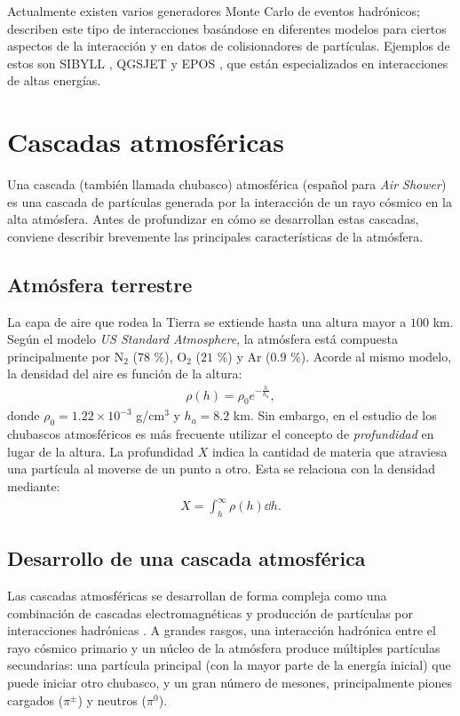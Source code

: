 	Actualmente existen varios generadores Monte Carlo de eventos hadrónicos; describen este tipo de interacciones basándose en diferentes modelos para ciertos aspectos de la interacción y en datos de colisionadores de partículas. Ejemplos de estos son SIBYLL \cite{Sibyll}, QGSJET \cite{qgsjet} y EPOS \cite{EPOS}, que están especializados en interacciones de altas energías. 
	

\section{Cascadas atmosf\'ericas}
	Una cascada (tambi\'en llamada chubasco) atmosf\'erica (español para \textit{Air Shower}) es una cascada de partículas generada por la interacción de un rayo cósmico en la alta atmósfera. Antes de profundizar en cómo se desarrollan estas cascadas, conviene describir brevemente las principales características de la atmósfera.
	
	\subsection{Atmósfera terrestre}
	La capa de aire que rodea la Tierra se extiende hasta una altura  mayor a $100$ km. Según el modelo \textit{US Standard Atmosphere}, la atmósfera está compuesta principalmente por N$_2$ ($78$ \%), O$_2$ ($21$ \%) y Ar ($0.9$ \%). Acorde al mismo modelo, la densidad del aire es función de la altura:
	\begin{align}
	\rho(h)=\rho_0 e^{-\frac{h}{h_a}},
	\end{align}
	donde $\rho_0 = 1.22\times 10^{-3}$ g/cm$^3$ y $h_a = 8.2$ km. Sin embargo, en el estudio de los chubascos atmosféricos es más frecuente utilizar el concepto de \textit{profundidad} en lugar de la altura. La profundidad $X$ indica la cantidad de materia que atraviesa una partícula al moverse de un punto a otro. Esta se relaciona con la densidad mediante:
	\begin{align}
	X = \int_h^{\infty} \rho (h) \dd h.
	\end{align}

	\subsection{Desarrollo de una cascada atmosférica}	
	Las cascadas atmosf\'ericas se desarrollan de forma compleja como una combinación de cascadas electromagnéticas y producción de partículas por interacciones hadrónicas \cite{Matthews2005}. A grandes rasgos, una interacción hadrónica entre el rayo cósmico primario y un núcleo de la atmósfera produce múltiples partículas secundarias: una partícula principal (con la mayor parte de la energía inicial) que puede iniciar otro chubasco, y un gran número de mesones, principalmente piones cargados ($\pi^{\pm}$) y neutros ($\pi^0$).\\

